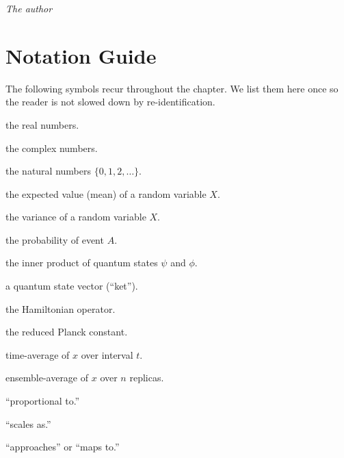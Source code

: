 \documentclass[11pt,a4paper]{book}
\theoremstyle{cleanrm}
\begin{document}
\vspace{1em}
\hfill\textit{The author}
\vspace{1em}

\chapter*{Notation Guide}

The following symbols recur throughout the chapter. We list them here
once so the reader is not slowed down by re-identification.

\begin{notationbox}
\begin{description}[leftmargin=2.5cm,style=nextline]
    \item[{$\mathbb{R}$}] the real numbers.
    \item[{$\mathbb{C}$}] the complex numbers.
    \item[{$\mathbb{N}$}] the natural numbers $\{0, 1, 2, \dots\}$.
    \item[{$\mathbb{E}[X]$}] the expected value (mean) of a random variable $X$.
    \item[{$\mathrm{Var}(X)$}] the variance of a random variable $X$.
    \item[{$P(A)$}] the probability of event $A$.
    \item[{$\langle \psi | \phi \rangle$}] the inner product of quantum states $\psi$ and $\phi$.
    \item[{$|\psi\rangle$}] a quantum state vector (``ket'').
    \item[{$\hat{H}$}] the Hamiltonian operator.
    \item[{$\hbar$}] the reduced Planck constant.
    \item[{$\bar{x}_t$}] time-average of $x$ over interval $t$.
    \item[{$\bar{x}_n$}] ensemble-average of $x$ over $n$ replicas.
    \item[{$\propto$}] ``proportional to.''
    \item[{$\sim$}] ``scales as.''
    \item[{$\to$}] ``approaches'' or ``maps to.''
\end{description}
\end{notationbox}
\end{document}
